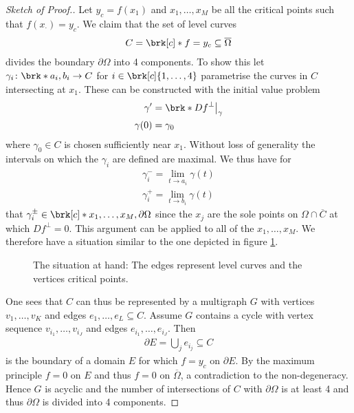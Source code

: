 \begin{proof}[Sketch of Proof.]
  Let $y_c=f(x_1)$ and $x_1,\dots,x_M$ be all the critical points such that $f(x_\cdot)=y_c$.
  We claim that the set of level curves
  \begin{align*}
    C=\brk[c]*{f=y_c}\subseteq\overline{\Omega}
  \end{align*}
  divides the boundary $\partial\Omega$ into 4 components. To show this let $\gamma_i\colon \brk*{a_i,b_i}\to C$ for $i\in\brk[c]{1,\dots,4}$ parametrise the curves in
  $C$ intersecting at $x_1$. These can be constructed with the initial value problem
  \begin{align*} 
    \gamma'&=\brk*{Df}^\perp\big\vert_\gamma \\
    \gamma(0) &= \gamma_0
  \end{align*}
  where $\gamma_0\in C$ is chosen sufficiently near $x_1$. Without loss of generality the intervals on which the $\gamma_i$ are
  defined are maximal. We thus have for
  \begin{align*}
    \gamma_i^-=\lim_{t\to a_i}\gamma(t) \\
    \gamma_i^+=\lim_{t\to b_i}\gamma(t)
  \end{align*}
  that $\gamma_i^\pm\in\brk[c]*{x_1,\dots,x_M,\partial\Omega}$ since the $x_j$ are the sole points on $\Omega\cap\overline{C}$
  at which $Df^\perp=0$. This argument can be applied to all of the 
  $x_1,\dots,x_M$. We therefore have a situation similar to the one depicted in figure \ref{fi:n2:levelSets:overview}.
  
  \begin{figure}
    \centering
    \def\svgwidth{0.6\textwidth}
    
    \caption{The situation at hand: The edges represent level curves and the vertices critical points.}
    \label{fi:n2:levelSets:overview}
  \end{figure}

  One sees that $C$ can thus be represented by a multigraph $G$ with vertices $v_1,\dots,v_K$ and edges $e_1,\dots,e_L\subseteq C$.
  Assume $G$ contains a cycle with vertex sequence $v_{i_1},\dots,v_{i_J}$ and edges $e_{i_1},\dots,e_{i_J}$. Then
  \begin{align*}
    \partial E = \bigcup_j e_{i_j}\subseteq C
  \end{align*}
  is the boundary of a domain $E$ for which $f=y_c$ on $\partial E$. By the maximum principle $f=0$ on $E$ and thus
  $f=0$ on $\overline{\Omega}$, a contradiction to the non-degeneracy. Hence $G$ is acyclic and the number of 
  intersections of $C$ with $\partial \Omega$ is at least 4 and thus $\partial\Omega$ is divided into 4 components.
  

\end{proof}
